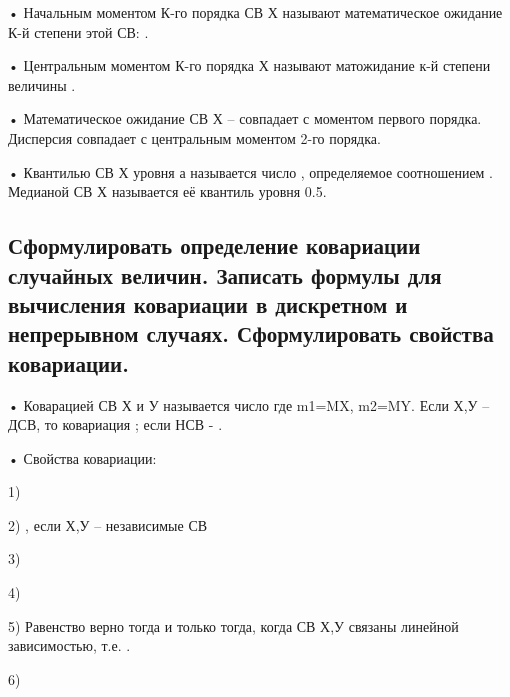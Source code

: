 • Начальным моментом К-го порядка СВ Х называют математическое ожидание К-й степени этой СВ:  .

• Центральным моментом К-го порядка Х называют матожидание к-й степени величины .

• Математическое ожидание СВ Х – совпадает с моментом первого порядка. Дисперсия совпадает с центральным моментом 2-го порядка.

• Квантилью СВ Х уровня а называется число , определяемое соотношением . Медианой СВ Х называется её квантиль уровня 0.5.

\subsection{Сформулировать определение ковариации случайных величин. Записать формулы для вычисления ковариации в дискретном и непрерывном случаях. Сформулировать свойства ковариации.}

• Коварацией СВ Х и У называется число  где m1=MX, m2=MY.
Если Х,У – ДСВ, то ковариация ;  если НСВ - .

• Свойства ковариации:

1) 

2) , если Х,У – независимые СВ

3) 

4) 

5) Равенство  верно тогда и только тогда, когда СВ Х,У связаны линейной зависимостью, т.е. .

6) 
